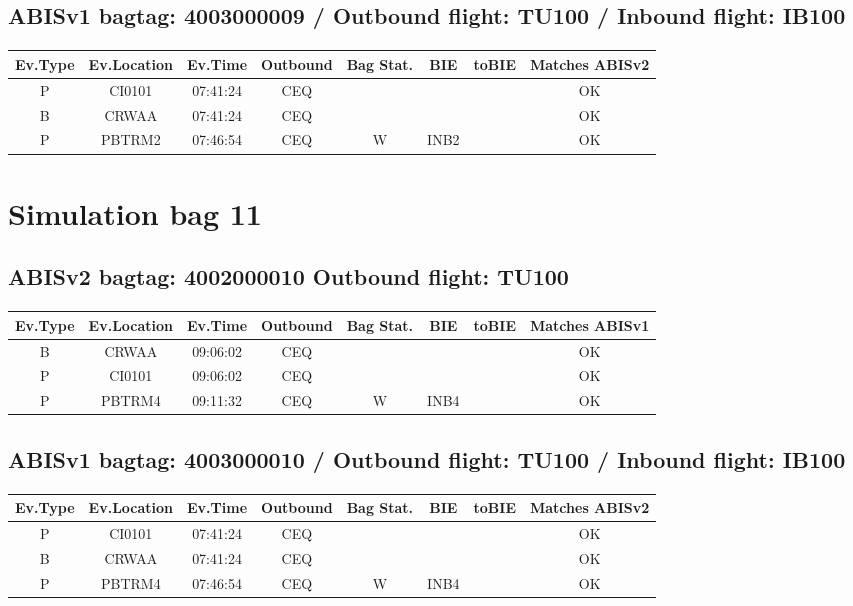 \documentclass{report}
\begin{document}
\subsection*{ABISv1 bagtag: 4003000009 / Outbound flight: TU100 / Inbound flight: IB100}
\paragraph{}
\begin{longtable}{cccccccc}    \toprule
\rowcolor{white!50}
\textbf{Ev.Type} & \textbf{Ev.Location} & \textbf{Ev.Time} & \textbf{Outbound} & \textbf{Bag Stat.} & \textbf{BIE} & \textbf{toBIE} & \textbf{Matches ABISv2} \\\midrule
P & CI0101 & 07:41:24  & CEQ &  &  &  & OK\\
B & CRWAA & 07:41:24  & CEQ &  &  &  & OK\\
P & PBTRM2 & 07:46:54  & CEQ & W & INB2 &  & OK\\
\bottomrule
\end{longtable}
\pagebreak
\section*{Simulation bag 11}
\subsection*{ABISv2 bagtag: 4002000010 Outbound flight: TU100}
\paragraph{}
\begin{longtable}{cccccccc}    \toprule
\rowcolor{white!50}
\textbf{Ev.Type} & \textbf{Ev.Location} & \textbf{Ev.Time} & \textbf{Outbound} & \textbf{Bag Stat.} & \textbf{BIE} & \textbf{toBIE} & \textbf{Matches ABISv1} \\\midrule
B & CRWAA & 09:06:02  & CEQ &  &  &  & OK\\
P & CI0101 & 09:06:02  & CEQ &  &  &  & OK\\
P & PBTRM4 & 09:11:32  & CEQ & W & INB4 &  & OK\\
\bottomrule
\end{longtable}
\subsection*{ABISv1 bagtag: 4003000010 / Outbound flight: TU100 / Inbound flight: IB100}
\paragraph{}
\begin{longtable}{cccccccc}    \toprule
\rowcolor{white!50}
\textbf{Ev.Type} & \textbf{Ev.Location} & \textbf{Ev.Time} & \textbf{Outbound} & \textbf{Bag Stat.} & \textbf{BIE} & \textbf{toBIE} & \textbf{Matches ABISv2} \\\midrule
P & CI0101 & 07:41:24  & CEQ &  &  &  & OK\\
B & CRWAA & 07:41:24  & CEQ &  &  &  & OK\\
P & PBTRM4 & 07:46:54  & CEQ & W & INB4 &  & OK\\
\bottomrule
\end{longtable}
\pagebreak
\end{document}
